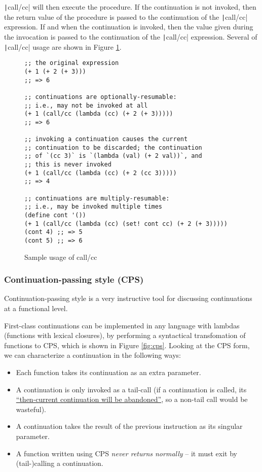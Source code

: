\documentclass[]{article}
\begin{document}
\texttt|call/cc| will then execute the procedure. If the continuation is not invoked, then the return value of the procedure is passed to the continuation of the \texttt|call/cc| expression. If and when the continuation is invoked, then the value given during the invocation is passed to the continuation of the \texttt|call/cc| expression. Several of \texttt|call/cc| usage are shown in Figure \ref{fig:ccce}.

\begin{figure}
  \centering
\begin{verbatim}
;; the original expression
(+ 1 (+ 2 (+ 3)))
;; => 6

;; continuations are optionally-resumable:
;; i.e., may not be invoked at all
(+ 1 (call/cc (lambda (cc) (+ 2 (+ 3)))))
;; => 6

;; invoking a continuation causes the current
;; continuation to be discarded; the continuation
;; of `(cc 3)` is `(lambda (val) (+ 2 val))`, and
;; this is never invoked
(+ 1 (call/cc (lambda (cc) (+ 2 (cc 3)))))
;; => 4

;; continuations are multiply-resumable:
;; i.e., may be invoked multiple times
(define cont '())
(+ 1 (call/cc (lambda (cc) (set! cont cc) (+ 2 (+ 3)))))
(cont 4) ;; => 5
(cont 5) ;; => 6
\end{verbatim}
  \caption{Sample usage of call/cc}
  \label{fig:ccce}
\end{figure}

\subsubsection{Continuation-passing style (CPS)}
\label{sec:cps}

Continuation-passing style is a very instructive tool for discussing continuations at a functional level.

First-class continuations can be implemented in any language with lambdas (functions with lexical closures), by performing a syntactical transfomation of functions to CPS, which is shown in Figure \ref{fig:cps}. Looking at the CPS form, we can characterize a continuation in the following ways:
\begin{itemize}
\item Each function takes its continuation as an extra parameter.
\item A continuation is only invoked as a tail-call (if a continuation is called, its \href{https://wiki.c2.com/?CallWithCurrentContinuation}{``then-current continuation will be abandoned''}, so a non-tail call would be wasteful).
\item A continuation takes the result of the previous instruction as its singular parameter.
\item A function written using CPS \textit{never returns normally} -- it must exit by (tail-)calling a continuation.
\end{itemize}
\end{document}
